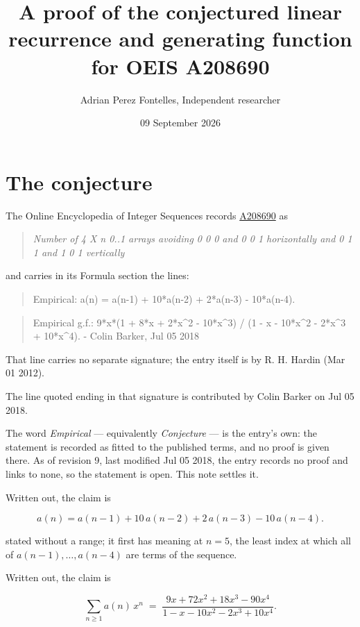 \documentclass[11pt]{article}
\title{A proof of the conjectured linear recurrence and generating function for OEIS A208690}
\author{Adrian Perez Fontelles, Independent researcher}
\date{09 September 2026}
\theoremstyle{definition}
\begin{document}
\maketitle
\section{The conjecture}

The Online Encyclopedia of Integer Sequences records \href{https://oeis.org/A208690}{A208690} as

\begin{quote}\itshape Number of 4 X n 0..1 arrays avoiding 0 0 0 and 0 0 1 horizontally and 0 1 1 and 1 0 1 vertically\end{quote}

and carries in its Formula section the lines:

\begin{quote}\ttfamily Empirical: a(n) = a(n-1) + 10*a(n-2) + 2*a(n-3) - 10*a(n-4).\end{quote}

\begin{quote}\ttfamily Empirical g.f.: 9*x*(1 + 8*x + 2*x\textasciicircum{}2 - 10*x\textasciicircum{}3) / (1 - x - 10*x\textasciicircum{}2 - 2*x\textasciicircum{}3 + 10*x\textasciicircum{}4). - Colin Barker, Jul 05 2018\end{quote}

That line carries no separate signature; the entry itself is by R. H. Hardin (Mar 01 2012).

The line quoted ending in that signature is contributed by Colin Barker on Jul 05 2018.

The word {\itshape Empirical} --- equivalently {\itshape Conjecture} --- is the entry's own: the statement is recorded as fitted to the published terms, and no proof is given there. As of revision 9, last modified Jul 05 2018, the entry records no proof and links to none, so the statement is open. This note settles it.

Written out, the claim is

\[a(n) = a(n-1) + 10\,a(n-2) + 2\,a(n-3) - 10\,a(n-4).\]

stated without a range; it first has meaning at $n = 5$, the least index at which all of $a(n-1),\dots,a(n-4)$ are terms of the sequence.

Written out, the claim is

\[\sum_{n \ge 1} a(n)\,x^n \;=\; \frac{9x + 72x^{2} + 18x^{3} - 90x^{4}}{1 - x - 10x^{2} - 2x^{3} + 10x^{4}}.\]
\end{document}
